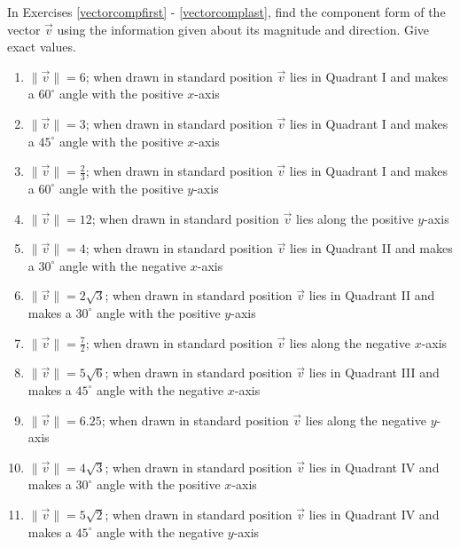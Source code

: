 \documentclass{ximera}
\begin{document}
In Exercises \ref{vectorcompfirst} - \ref{vectorcomplast}, find the component form of the vector $\vec{v}$ using the information given about its magnitude and direction.  Give exact values.

\begin{enumerate}

\setcounter{enumi}{\value{HW}}

\item $\|\vec{v}\| = 6$; when drawn in standard position $\vec{v}$ lies in Quadrant I and makes a $60^{\circ}$ angle with the positive $x$-axis \label{vectorcompfirst}

\item $\|\vec{v}\| = 3$; when drawn in standard position $\vec{v}$ lies in Quadrant I and makes a $45^{\circ}$ angle with the positive $x$-axis

\item $\|\vec{v}\| = \frac{2}{3}$; when drawn in standard position $\vec{v}$ lies in Quadrant I and makes a $60^{\circ}$ angle with the positive $y$-axis

\item $\|\vec{v}\| = 12$; when drawn in standard position $\vec{v}$ lies along the positive $y$-axis

\item $\|\vec{v}\| = 4$; when drawn in standard position $\vec{v}$ lies in Quadrant II and makes a $30^{\circ}$ angle with the negative $x$-axis

\item $\|\vec{v}\| = 2\sqrt{3}$; when drawn in standard position $\vec{v}$ lies in Quadrant II and makes a $30^{\circ}$ angle with the positive $y$-axis

\item $\|\vec{v}\| = \frac{7}{2}$; when drawn in standard position $\vec{v}$ lies along the negative $x$-axis

\item $\|\vec{v}\| = 5\sqrt{6}$; when drawn in standard position $\vec{v}$ lies in Quadrant III and makes a $45^{\circ}$ angle with the negative $x$-axis

\item $\|\vec{v}\| = 6.25$; when drawn in standard position $\vec{v}$ lies along the negative $y$-axis

\item $\|\vec{v}\| = 4\sqrt{3}$; when drawn in standard position $\vec{v}$ lies in Quadrant IV and makes a $30^{\circ}$ angle with the positive $x$-axis

\item $\|\vec{v}\| = 5\sqrt{2}$; when drawn in standard position $\vec{v}$ lies in Quadrant IV and makes a $45^{\circ}$ angle with the negative $y$-axis


\end{enumerate}
\end{document}
